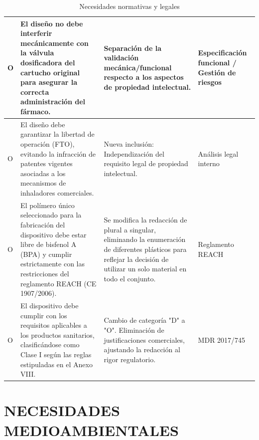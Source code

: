 \documentclass[11pt,a4paper]{article}
\begin{document}
\begin{table}[H]
\begin{tabular}{|p{2.8cm}|p{5.5cm}|p{2.5cm}|p{3.0cm}|}
\hline
O & El diseño no debe interferir mecánicamente con la válvula dosificadora del cartucho original para asegurar la correcta administración del fármaco. & Separación de la validación mecánica/funcional respecto a los aspectos de propiedad intelectual. & Especificación funcional / Gestión de riesgos\\
\hline
O & El diseño debe garantizar la libertad de operación (FTO), evitando la infracción de patentes vigentes asociadas a los mecanismos de inhaladores comerciales. & Nueva inclusión: Independización del requisito legal de propiedad intelectual.& Análisis legal interno\\
\hline
O & El polímero único seleccionado para la fabricación del dispositivo debe estar libre de bisfenol A (BPA) y cumplir estrictamente con las restricciones del reglamento REACH (CE 1907/2006). & Se modifica la redacción de plural a singular, eliminando la enumeración de diferentes plásticos para reflejar la decisión de utilizar un solo material en todo el conjunto. & Reglamento REACH \\
\hline
O & El dispositivo debe cumplir con los requisitos aplicables a los productos sanitarios, clasificándose como Clase I según las reglas estipuladas en el Anexo VIII. & Cambio de categoría "D" a "O". Eliminación de justificaciones comerciales, ajustando la redacción al rigor regulatorio. & MDR 2017/745 \\
\hline
\end{tabular}
\caption{Necesidades normativas y legales}
\end{table}
\newpage


\section{NECESIDADES MEDIOAMBIENTALES}


\vspace{0.5cm}
\end{document}
